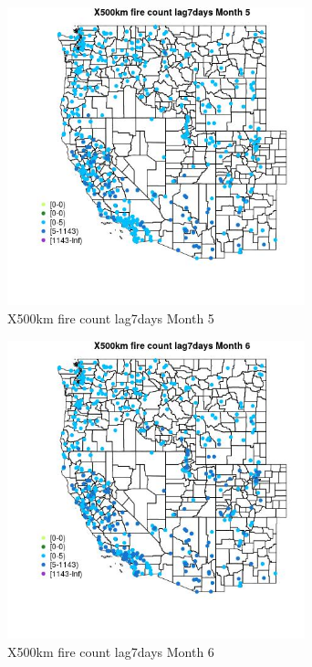 \begin{figure} 
\centering  
\includegraphics[width=0.77\textwidth]{Code_Outputs/Report_ML_input_PM25_Step4_part_e_de_duplicated_aves_compiled_2019-05-14wNAs_MapObsMo5X500km_fire_count_lag7days.jpg} 
\caption{\label{fig:Report_ML_input_PM25_Step4_part_e_de_duplicated_aves_compiled_2019-05-14wNAsMapObsMo5X500km_fire_count_lag7days}X500km fire count lag7days Month 5} 
\end{figure} 
 

\begin{figure} 
\centering  
\includegraphics[width=0.77\textwidth]{Code_Outputs/Report_ML_input_PM25_Step4_part_e_de_duplicated_aves_compiled_2019-05-14wNAs_MapObsMo6X500km_fire_count_lag7days.jpg} 
\caption{\label{fig:Report_ML_input_PM25_Step4_part_e_de_duplicated_aves_compiled_2019-05-14wNAsMapObsMo6X500km_fire_count_lag7days}X500km fire count lag7days Month 6} 
\end{figure} 
 

